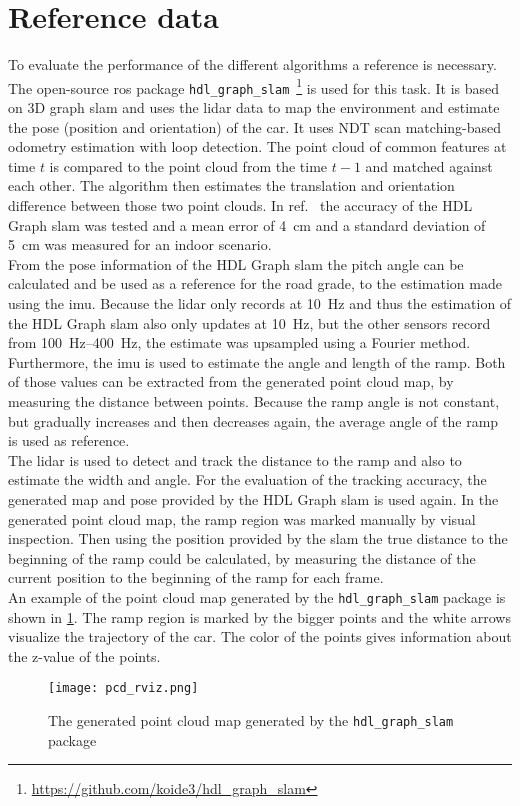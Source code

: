 \section{Reference data}
To evaluate the performance of the different algorithms a reference is necessary.
The open-source \gls{ros} package \texttt{hdl\_graph\_slam}~\footnote{\url{https://github.com/koide3/hdl_graph_slam}} is used for this task.
It is based on 3D graph \gls{slam} and uses the \gls{lidar} data to map the environment and estimate the pose (position and orientation) of the car.
It uses NDT scan matching-based odometry estimation with loop detection.
The point cloud of common features at time $t$ is compared to the point cloud from the time $t-1$ and matched against each other.
The algorithm then estimates the translation and orientation difference between those two point clouds.
In ref.~\cite{Akpnar2021} the accuracy of the HDL Graph \gls{slam} was tested and a mean error of \SI{4}{\cm} and a standard deviation of \SI{5}{\cm} was measured for an indoor scenario.\\
From the pose information of the HDL Graph \gls{slam} the pitch angle can be calculated and be used as a reference for the road grade, to the estimation made using the \gls{imu}.
Because the \gls{lidar} only records at \SI{10}{\hertz} and thus the estimation of the HDL Graph \gls{slam} also only updates at \SI{10}{\hertz}, but the other sensors record from \SIrange{100}{400}{\hertz}, the estimate was upsampled using a Fourier method.
Furthermore, the \gls{imu} is used to estimate the angle and length of the ramp.
Both of those values can be extracted from the generated point cloud map, by measuring the distance between points.
Because the ramp angle is not constant, but gradually increases and then decreases again, the average angle of the ramp is used as reference.\\
The \gls{lidar} is used to detect and track the distance to the ramp and also to estimate the width and angle.
For the evaluation of the tracking accuracy, the generated map and pose provided by the HDL Graph \gls{slam} is used again.
In the generated point cloud map, the ramp region was marked manually by visual inspection.
Then using the position provided by the \gls{slam} the true distance to the beginning of the ramp could be calculated, by measuring the distance of the current position to the beginning of the ramp for each frame.\\
An example of the point cloud map generated by the \texttt{hdl\_graph\_slam} package is shown in \cref{fig:pcd_rviz}.
The ramp region is marked by the bigger points and the white arrows visualize the trajectory of the car.
The color of the points gives information about the z-value of the points.
\begin{figure}[htbp]
    \centering
    \texttt{[image: pcd\_rviz.png]}
    \caption[Generated point cloud]{The generated point cloud map generated by the \texttt{hdl\_graph\_slam} package}
    \label{fig:pcd_rviz}
\end{figure}



